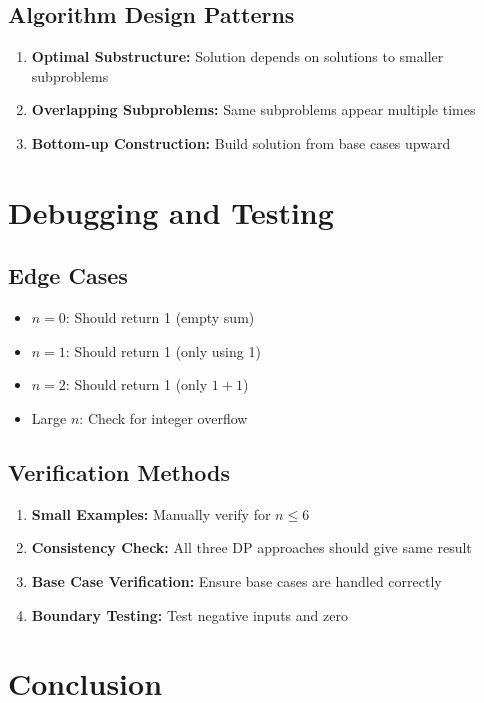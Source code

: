 \documentclass[12pt,a4paper]{article}
\begin{document}
\subsection{Algorithm Design Patterns}
\begin{enumerate}
\item \textbf{Optimal Substructure:} Solution depends on solutions to smaller subproblems
\item \textbf{Overlapping Subproblems:} Same subproblems appear multiple times
\item \textbf{Bottom-up Construction:} Build solution from base cases upward
\end{enumerate}

\section{Debugging and Testing}

\subsection{Edge Cases}
\begin{itemize}
\item $n = 0$: Should return 1 (empty sum)
\item $n = 1$: Should return 1 (only using 1)
\item $n = 2$: Should return 1 (only $1+1$)
\item Large $n$: Check for integer overflow
\end{itemize}

\subsection{Verification Methods}
\begin{enumerate}
\item \textbf{Small Examples:} Manually verify for $n \leq 6$
\item \textbf{Consistency Check:} All three DP approaches should give same result
\item \textbf{Base Case Verification:} Ensure base cases are handled correctly
\item \textbf{Boundary Testing:} Test negative inputs and zero
\end{enumerate}

\section{Conclusion}
\end{document}
